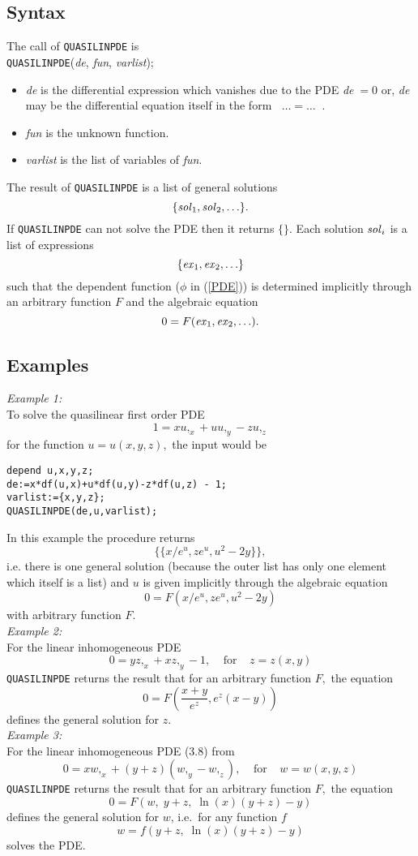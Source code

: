\subsection{Syntax}
The call of {\tt QUASILINPDE} is \\
{\tt QUASILINPDE}({\it de}, {\it fun}, {\it varlist});
\begin{itemize}
\item
{\it de} is the differential expression which vanishes due to the PDE
{\it de}$\; = 0$ or, {\it de} may be the differential equation itself in the
form $\;\;\ldots = \ldots\;\;$.
\item
{\it fun} is the unknown function.
\item
{\it varlist} is the list of variables of {\it fun}.
\end{itemize}
The result of {\tt QUASILINPDE} is a list of general solutions
\[      \{{\it sol}_1, {\it sol}_2, \ldots \}.  \]
If {\tt QUASILINPDE} can not solve the PDE then it returns $\{\}$.
Each solution ${\it sol}_i$ is a list of expressions
\[      \{{\it ex}_1, {\it ex}_2, \ldots \}  \]
such that the dependent function ($\phi$ in (\ref{PDE})) is determined
implicitly through an arbitrary function $F$ and the algebraic
equation \[ 0 = F({\it ex}_1, {\it ex}_2, \ldots). \]
\subsection{Examples}
{\em Example 1:}\\
To solve the quasilinear first order PDE \[1 = xu,_x + uu,_y - zu,_z\]
for the function $u = u(x,y,z),$ the input would be
\small \begin{verbatim}
depend u,x,y,z;
de:=x*df(u,x)+u*df(u,y)-z*df(u,z) - 1;
varlist:={x,y,z};
QUASILINPDE(de,u,varlist);
\end{verbatim} \normalsize
In this example the procedure returns
\[\{ \{ x/e^u, ze^u, u^2 - 2y \} \},\]
i.e. there is one general solution (because the outer list has only one
element which itself is a list) and $u$ is given implicitly through
the algebraic equation
\[ 0 = F(x/e^u, ze^u, u^2 - 2y)\]
with arbitrary function $F.$ \\
{\em Example 2:}\\
For the linear inhomogeneous PDE
\[ 0 = y z,_x + x z,_y - 1, \;\;\;\;\mbox{for}\;\;\;\;z=z(x,y)\]
{\tt QUASILINPDE} returns the result that for an arbitrary function $F,$ the
equation
\[ 0 = F\left(\frac{x+y}{e^z},e^z(x-y)\right) \]
defines the general solution for $z$. \\
{\em Example 3:}\\
For the linear inhomogeneous PDE (3.8) from \cite{KamkePDE}
\[ 0 = x w,_x + (y+z)(w,_y - w,_z), \;\;\;\;\mbox{for}\;\;\;\;w=w(x,y,z)\]
{\tt QUASILINPDE} returns the result
that for an arbitrary function $F,$ the equation
\[ 0 = F\left(w, \;y+z, \;\ln(x)(y+z)-y\right) \]
defines the general solution for $w$, i.e.\ for any function $f$
\[ w = f\left(y+z, \;\ln(x)(y+z)-y\right) \]
solves the PDE.
